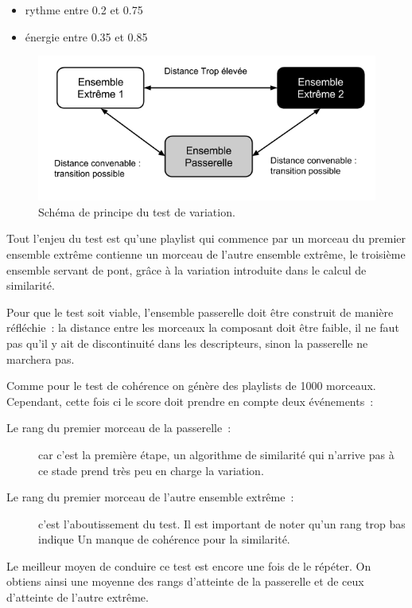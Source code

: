 \begin{itemize}
  \item rythme entre 0.2 et 0.75
  \item énergie entre 0.35 et 0.85
\end{itemize}

\begin{figure}[H]
\includegraphics[width=\textwidth]{data/tests/test-variation-passerelle.png}
\caption{Schéma de principe du test de variation.}
\end{figure}

Tout l'enjeu du test est qu'une playlist qui commence par un morceau du premier
ensemble extrême contienne un morceau de l'autre ensemble extrême, le troisième
ensemble servant de pont, grâce à la variation introduite dans le calcul de
similarité.

Pour que le test soit viable, l'ensemble passerelle doit être construit de
manière réfléchie~: la distance entre les morceaux la composant doit être faible,
il ne faut pas qu'il y ait de discontinuité dans les descripteurs, sinon la
passerelle ne marchera pas.

Comme pour le test de cohérence on génère des playlists de 1000 morceaux.
Cependant, cette fois ci le score doit prendre en compte deux événements~:
\begin{description}
  \item[Le rang du premier morceau de la passerelle~:] car c'est la première
  étape, un algorithme de similarité qui n'arrive pas à ce stade prend très peu
  en charge la variation.
  \item[Le rang du premier morceau de l'autre ensemble extrême~:] c'est
  l'aboutissement du test. Il est important de noter qu'un rang trop bas indique
  Un manque de cohérence pour la similarité.
\end{description}

Le meilleur moyen de conduire ce test est encore une fois de le répéter. On
obtiens ainsi une moyenne des rangs d'atteinte de la passerelle et de ceux
d'atteinte de l'autre extrême.

